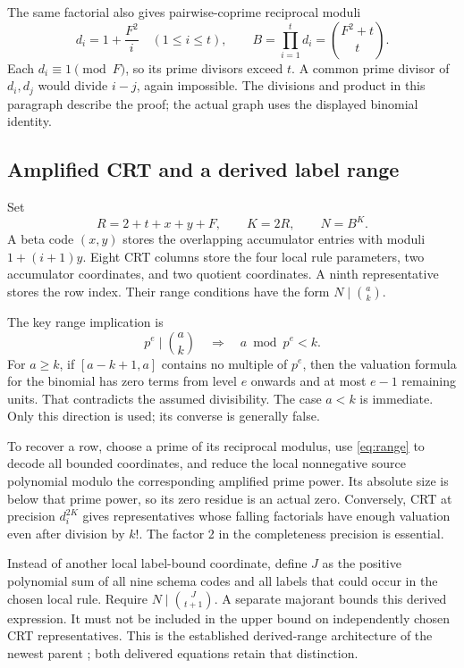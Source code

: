\documentclass[11pt,letterpaper]{article}
\theoremstyle{remark}\newtheorem{remark}[theorem]{Remark}
\begin{document}
The same factorial also gives pairwise-coprime reciprocal moduli
\[
 d_i=1+\frac{F^2}{i}\quad(1\le i\le t),\qquad
 B=\prod_{i=1}^t d_i=\binom{F^2+t}{t}.
\]
Each \(d_i\equiv1\pmod F\), so its prime divisors exceed \(t\).
A common prime divisor of \(d_i,d_j\) would divide \(i-j\), again
impossible. The divisions and product in this paragraph describe the
proof; the actual graph uses the displayed binomial identity.

\subsection{Amplified CRT and a derived label range}

Set
\[
 R=2+t+x+y+F,\qquad K=2R,\qquad N=B^K.
\]
A beta code \((x,y)\) stores the overlapping accumulator entries with
moduli \(1+(i+1)y\). Eight CRT columns store the four local rule
parameters, two accumulator coordinates, and two quotient coordinates. A ninth
representative stores the row index. Their range conditions have the form
\(N\mid\binom{a}{k}\).

The key range implication is
\begin{equation}
 p^e\mid\binom{a}{k}\quad\Longrightarrow\quad
                 a\bmod p^e<k. \label{eq:range}
\end{equation}
For \(a\ge k\), if \([a-k+1,a]\) contains no multiple of \(p^e\),
then the valuation formula for the binomial has zero terms from level
\(e\) onwards and at most \(e-1\) remaining units. That contradicts
the assumed divisibility. The case \(a<k\) is immediate. Only this
direction is used; its converse is generally false.

To recover a row, choose a prime of its reciprocal modulus, use
\eqref{eq:range} to decode all bounded coordinates, and reduce the local
nonnegative source polynomial modulo the corresponding amplified prime
power. Its absolute size is below that prime power, so its zero residue
is an actual zero. Conversely, CRT at precision \(d_i^{2K}\) gives
representatives whose falling factorials have enough valuation even after
division by \(k!\). The factor 2 in the completeness precision is
essential.

Instead of another local label-bound coordinate, define \(J\) as the
positive polynomial sum of all nine schema codes and all labels that
could occur in the chosen local rule. Require
\(N\mid\binom{J}{t+1}\). A separate majorant bounds this derived
expression. It must not be included in the upper bound on independently
chosen CRT representatives. This is the established derived-range
architecture of the newest parent \cite{round14}; both delivered equations
retain that distinction.
\end{document}
